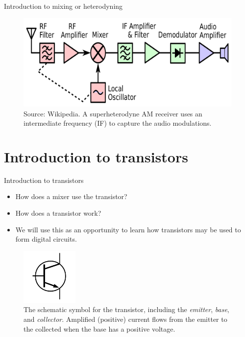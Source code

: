 \documentclass{beamer}
\begin{document}
\begin{frame}{Introduction to mixing or heterodyning}
\begin{figure}
\centering
\includegraphics[width=\textwidth]{figures/superhetWiki.png}
\caption{\label{fig:superHet} Source: Wikipedia.  A superheterodyne AM receiver uses an intermediate frequency (IF) to capture the audio modulations.}
\end{figure}
\end{frame}

\section{Introduction to transistors}

\begin{frame}{Introduction to transistors}
\begin{itemize}
\item How does a mixer use the transistor?
\item How does a transistor work?
\item We will use this as an opportunity to learn how transistors may be used to form digital circuits.
\end{itemize}
\begin{figure}
\centering
\includegraphics[width=0.25\textwidth]{figures/transistor.pdf}
\caption{\label{fig:transistor} The schematic symbol for the transistor, including the \textit{emitter}, \textit{base}, and \textit{collector}. Amplified (positive) current flows from the emitter to the collected when the base has a positive voltage.}
\end{figure}
\end{frame}
\end{document}
